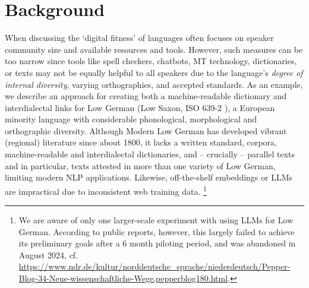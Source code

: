 \section{Background}

When discussing the `digital fitness' of languages \cite{soria2016fostering}
often focuses on speaker community size and available resources and tools. However, such measures can be too narrow since tools like spell checkers, chatbots, MT technology, dictionaries, or texts may not be equally  helpful to all speakers due to the language's \emph{degree of internal diversity}, varying orthographies, and accepted standards.
As an example, we describe an approach for creating both a machine-readable dictionary and interdialectal links for Low German (Low Saxon, ISO 639-2 ), a European minority language with considerable phonological, morphological and orthographic diversity. Although Modern Low German has developed vibrant (regional) literature since about 1800, it lacks a written standard, corpora, machine-readable and interdialectal dictionaries, and -- crucially -- parallel texts and in particular, texts attested in more than one variety of Low German, limiting modern NLP applications. Likewise, off-the-shelf embeddings or LLMs are impractical due to inconsistent web training data.
\footnote{
    We are aware of only one larger-scale experiment with using LLMs for Low German. According to public reports, however, this largely failed to achieve its preliminary goals after a 6 month piloting period, and was abandoned in August 2024, cf. \url{https://www.ndr.de/kultur/norddeutsche_sprache/niederdeutsch/Pepper-Blog-34-Neue-wissenschaftliche-Wege,pepperblog180.html}.
}

